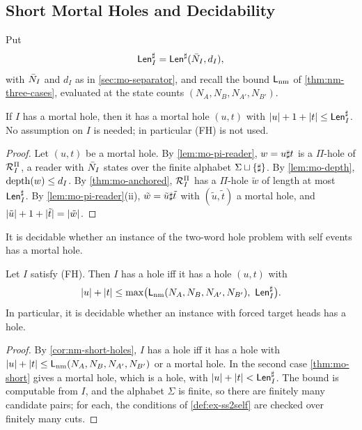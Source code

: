 \subsection{Short Mortal Holes and Decidability}\label{sec:mo-short}

Put
\[
 \mathsf{Len}^{\sharp}_I=\mathsf{Len}^{\sharp}(\bar N_I,d_I),
\]
with $\bar N_I$ and $d_I$ as in \cref{sec:mo-separator}, and recall the bound
$\mathsf L_{\mathrm{nm}}$ of \cref{thm:nm-three-cases}, evaluated at the state counts
$(N_A,N_B,N_{A'},N_{B'})$.

\begin{theorem}\label{thm:mo-short}
If $I$ has a mortal hole, then it has a mortal hole $(u,t)$ with
$\lvert u\rvert+1+\lvert t\rvert\le\mathsf{Len}^{\sharp}_I$. No assumption on $I$ is needed; in particular
(FH) is not used.
\end{theorem}

\begin{proof}
Let $(u,t)$ be a mortal hole. By \cref{lem:mo-pi-reader}, $w=u\sharp t$ is a
$\Pi$-hole of $\mathcal{R}^{\Pi}_I$, a reader with $\bar N_I$ states over the finite alphabet
$\Sigma\sqcup\{\sharp\}$. By \cref{lem:mo-depth}, $\operatorname{depth}(w)\le d_I$. By
\cref{thm:mo-anchored}, $\mathcal{R}^{\Pi}_I$ has a $\Pi$-hole $\tilde w$ of length at most
$\mathsf{Len}^{\sharp}_I$. By \cref{lem:mo-pi-reader}(ii), $\tilde w=\tilde u\sharp\tilde t$
with $(\tilde u,\tilde t)$ a mortal hole, and
$\lvert \tilde u\rvert+1+\lvert \tilde t\rvert=\lvert \tilde w\rvert$.
\end{proof}

\begin{corollary}\label{cor:mo-decidable}
It is decidable whether an instance of the two-word hole problem with self
events has a mortal hole.
\end{corollary}

\begin{theorem}\label{thm:mo-decide}
Let $I$ satisfy (FH). Then $I$ has a hole iff it has a hole $(u,t)$ with
\[
 \lvert u\rvert+\lvert t\rvert\le\max\bigl(\mathsf L_{\mathrm{nm}}(N_A,N_B,N_{A'},N_{B'}),\ \mathsf{Len}^{\sharp}_I\bigr).
\]
In particular, it is decidable whether an instance with forced target heads
has a hole.
\end{theorem}

\begin{proof}
By \cref{cor:nm-short-holes}, $I$ has a hole iff it has a hole with
$\lvert u\rvert+\lvert t\rvert\le\mathsf L_{\mathrm{nm}}(N_A,N_B,N_{A'},N_{B'})$ or a mortal hole. In the second case
\cref{thm:mo-short} gives a mortal hole, which is a hole, with
$\lvert u\rvert+\lvert t\rvert<\mathsf{Len}^{\sharp}_I$. The bound is computable from $I$, and the alphabet
$\Sigma$ is finite, so there are finitely many candidate pairs; for each, the
conditions of \cref{def:ex-ss2self} are checked over finitely many cuts.
\end{proof}

